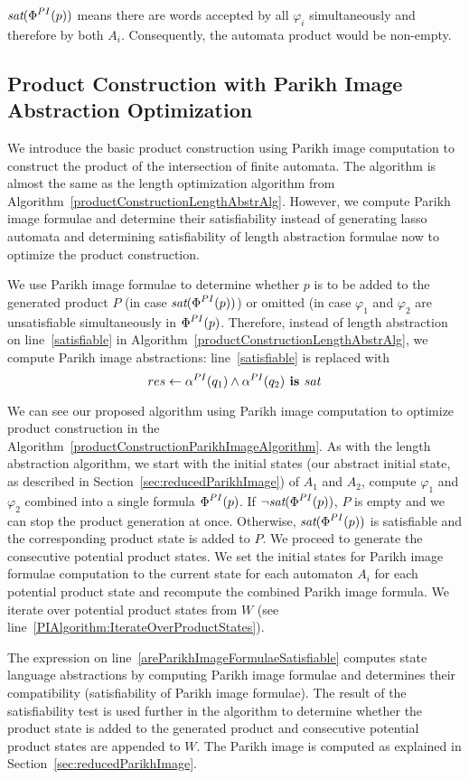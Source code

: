 $\emph{sat}(\emph{$\Phi$}^{PI}(p))$ means there are words accepted by all $\varphi_i$ simultaneously and therefore by both $A_i$. Consequently, the automata product would be non-empty.

\subsection{Product Construction with Parikh Image Abstraction Optimization}

We introduce the basic product construction using Parikh image computation to construct the product of the intersection of finite automata. The algorithm is almost the same as the length optimization algorithm from Algorithm~\ref{productConstructionLengthAbstrAlg}. However, we compute Parikh image formulae and determine their satisfiability instead of generating lasso automata and determining satisfiability of length abstraction formulae now to optimize the product construction.

We use Parikh image formulae to determine whether $p$ is to be added to the generated product $P$ (in case $\emph{sat}(\emph{$\Phi$}^{PI}(p))$) or omitted (in case $\varphi_1$ and $\varphi_2$ are unsatisfiable simultaneously in $\emph{$\Phi$}^{PI}(p)$. Therefore, instead of length abstraction on line~\ref{satisfiable} in Algorithm~\ref{productConstructionLengthAbstrAlg}, we compute Parikh image abstractions: line~\ref{satisfiable}  is replaced with
\[
    res \gets \alpha^{PI}(q_1) \land \alpha^{PI}(q_2) \textbf{ is } sat
\]

We can see our proposed algorithm using Parikh image computation to optimize product construction in the Algorithm~\ref{productConstructionParikhImageAlgorithm}. As with the length abstraction algorithm, we start with the initial states (our abstract initial state, as described in Section~\ref{sec:reducedParikhImage}) of $A_1$ and $A_2$, compute $\varphi_1$ and $\varphi_2$ combined into a single formula $\emph{$\Phi$}^{PI}(p)$. If $\neg \emph{sat}(\emph{$\Phi$}^{PI}(p))$, $P$ is empty and we can stop the product generation at once. Otherwise, $\emph{sat}(\emph{$\Phi$}^{PI}(p))$ is satisfiable and the corresponding product state is added to $P$. We proceed to generate the consecutive potential product states. We set the initial states for Parikh image formulae computation to the current state for each automaton $A_i$ for each potential product state and recompute the combined Parikh image formula. We iterate over potential product states from $W$ (see line~\ref{PIAlgorithm:IterateOverProductStates}).

The expression on line~\ref{areParikhImageFormulaeSatisfiable} computes state language abstractions by computing Parikh image formulae and determines their compatibility (satisfiability of Parikh image formulae). The result of the satisfiability test is used further in the algorithm to determine whether the product state is added to the generated product and consecutive potential product states are appended to $W$. The Parikh image is computed as explained in Section~\ref{sec:reducedParikhImage}.

